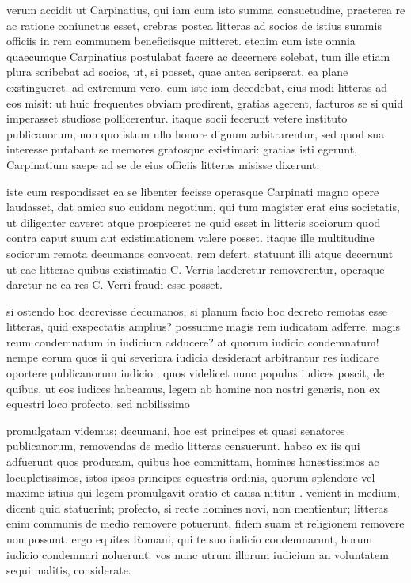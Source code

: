  verum accidit ut Carpinatius, qui iam cum isto summa consuetudine, praeterea re ac ratione coniunctus esset, crebras postea litteras ad socios de istius summis officiis in rem communem beneficiisque mitteret. etenim cum iste omnia quaecumque Carpinatius postulabat facere ac decernere solebat, tum ille etiam plura scribebat ad socios, ut, si posset, quae antea scripserat, ea plane exstingueret. ad extremum vero, cum iste iam decedebat, eius modi litteras ad eos misit: ut huic frequentes obviam prodirent, gratias agerent, facturos se si quid imperasset studiose pollicerentur. itaque socii fecerunt vetere instituto publicanorum, non quo istum ullo honore dignum arbitrarentur, sed quod sua interesse putabant se memores gratosque existimari: gratias isti egerunt, Carpinatium saepe ad se de eius officiis litteras misisse dixerunt.

 iste cum respondisset ea se libenter fecisse operasque Carpinati magno opere laudasset, dat amico suo cuidam negotium, qui tum magister erat eius societatis, ut diligenter caveret atque prospiceret ne quid esset in litteris sociorum quod contra caput suum aut existimationem valere posset. itaque ille multitudine sociorum remota decumanos convocat, rem defert. statuunt illi atque decernunt ut eae litterae quibus existimatio C. Verris laederetur removerentur, operaque daretur ne ea res C. Verri fraudi esse posset.

 si ostendo hoc decrevisse decumanos, si planum facio hoc decreto remotas esse litteras, quid exspectatis amplius? possumne magis rem iudicatam adferre, magis reum condemnatum in iudicium adducere? at quorum iudicio condemnatum! nempe eorum quos ii qui severiora iudicia desiderant arbitrantur res iudicare oportere publicanorum iudicio ; quos videlicet nunc populus iudices poscit, de quibus, ut eos iudices habeamus, legem ab homine non nostri generis, non ex equestri loco profecto, sed nobilissimo

 promulgatam videmus; decumani, hoc est principes et quasi senatores publicanorum, removendas de medio litteras censuerunt. habeo ex iis qui adfuerunt quos producam, quibus hoc committam, homines honestissimos ac locupletissimos, istos ipsos principes equestris ordinis, quorum splendore vel maxime istius qui legem promulgavit oratio et causa nititur . venient in medium, dicent quid statuerint; profecto, si recte homines novi, non mentientur; litteras enim communis de medio removere potuerunt, fidem suam et religionem removere non possunt. ergo equites Romani, qui te suo iudicio condemnarunt, horum iudicio condemnari noluerunt: vos nunc utrum illorum iudicium an voluntatem sequi malitis, considerate.

